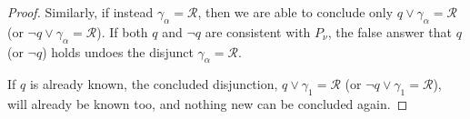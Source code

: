 \documentclass[twoside,twocolumn,a4paper,11pt]{article}
\theoremstyle{definition}
\begin{document}
\begin{proof}


Similarly, if instead $\gamma_\alpha=\mathcal{R}$, then we are able to conclude only
$q \vee \gamma_\alpha\!=\!\mathcal{R}$ (or $\neg q \vee \gamma_\alpha\!=\!\mathcal{R}$).
If 
both $q$ and $\neg q$ are consistent with $P_\nu$,
the false answer that $q$ (or $\neg q$) holds
undoes the disjunct $\gamma_\alpha=\mathcal{R}$. 

If $q$ is already known, 
the concluded disjunction, 
$q \vee \gamma_1\!=\!\mathcal{R}$ (or $\neg q \vee \gamma_1\!=\!\mathcal{R}$),
will already be known too, and nothing new can be concluded again.
\end{proof}



%
\end{document}
